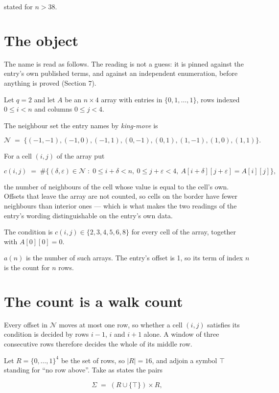 \documentclass[11pt]{article}
\theoremstyle{definition}
\begin{document}
stated for $n > 38$.

\section{The object}

The name is read as follows. The reading is not a guess: it is pinned against the entry's own published terms, and against an independent enumeration, before anything is proved (Section 7).

Let $q = 2$ and let $A$ be an $n \times 4$ array with entries in $\{0,1,\dots,1\}$, rows indexed $0 \le i < n$ and columns $0 \le j < 4$.

The neighbour set the entry names by {\itshape king-move} is

\[\mathcal{N} \;=\; \{(-1,-1), (-1,0), (-1,1), (0,-1), (0,1), (1,-1), (1,0), (1,1)\}.\]

For a cell $(i,j)$ of the array put

\[c(i,j) \;=\; \#\bigl\{(\delta,\varepsilon)\in\mathcal{N} \;:\; 0\le i+\delta<n,\ 0\le j+\varepsilon<4,\ A[i+\delta][j+\varepsilon] = A[i][j]\bigr\},\]

the number of neighbours of the cell whose value is equal to the cell's own. Offsets that leave the array are not counted, so cells on the border have fewer neighbours than interior ones --- which is what makes the two readings of the entry's wording distinguishable on the entry's own data.

The condition is $c(i,j) \in \{2, 3, 4, 5, 6, 8\}$ for every cell of the array, together with $A[0][0]=0$.

$a(n)$ is the number of such arrays. The entry's offset is 1, so its term of index $n$ is the count for $n$ rows.

\section{The count is a walk count}

Every offset in $\mathcal{N}$ moves at most one row, so whether a cell $(i,j)$ satisfies its condition is decided by rows $i-1$, $i$ and $i+1$ alone. A window of three consecutive rows therefore decides the whole of its middle row.

Let $R = \{0,\dots,1\}^{4}$ be the set of rows, so $|R| = 16$, and adjoin a symbol $\top$ standing for ``no row above''. Take as states the pairs

\[\Sigma \;=\; (R \cup \{\top\}) \times R,\]
\end{document}
